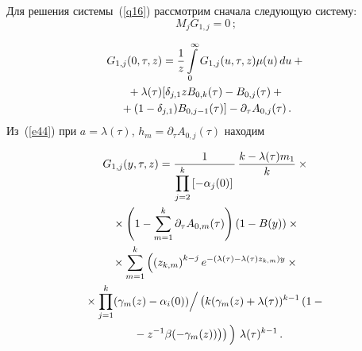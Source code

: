 \begin{multicols}{2}
Для решения системы~(\ref{q16}) рассмотрим сначала следующую систему:
$$
M_{j}G_{1,j}=0\,;
$$


\vspace*{-12pt}

\noindent
\begin{multline*}
G_{1,j}(0,\tau,z)=\displaystyle\frac{\displaystyle 1\mathstrut}{\displaystyle z\mathstrut}\int\limits_{0}^{\infty}G_{1,j}(u,\tau,z)\mu(u)\,du+{}\\
{}+\lambda(\tau)[\delta_{j,1}zB_{0,k}(\tau)-B_{0,j}(\tau)+{}\\
{}+(1-\delta_{j,1})B_{0,j-1}(\tau)]-\partial_{\tau}A_{0,j}(\tau)\,.
\end{multline*}
Из~(\ref{e44}) при $a=\lambda(\tau)$, $h_{m}=\partial_{\tau}A_{0,j}(\tau)$ находим
\pagebreak

\noindent
\begin{multline*}
G_{1,j}(y,\tau,z)=
\fr{1}{\prod\limits_{j=2}^{k}\left[-\alpha_{j}(0)\right]}\,\fr{k-\lambda(\tau)m_{1}}{k}\times{}\\
{}\times
\left(1-\sum_{m=1}^{k}\partial_{\tau}A_{0,m}(\tau)\right)\left(1-B(y)\right)\times{}\\
{}\times\sum_{m=1}^{k}
\left (\left(z_{k,m}\right)^{k-j}
e^{-(\lambda(\tau)-\lambda(\tau)z_{k,m})y}\times{}\right.\\
{}\times
\prod\limits_{j=1}^{k}(\gamma_{m}(z)-\alpha_{i}(0))\Big /
 \left (k(\gamma_{m}(z)+\lambda(\tau))^{k-1}\left(1-{}\right.\right.\\
\left.\left.\left. {}-z^{-1}
 \beta(-\gamma_{m}(z))\right)\right )
 \vphantom{\left(z_{k,m}\right)^{k-j}}
 \right )\,\lambda(\tau)^{k-1}\,.
\end{multline*}


\end{multicols}
